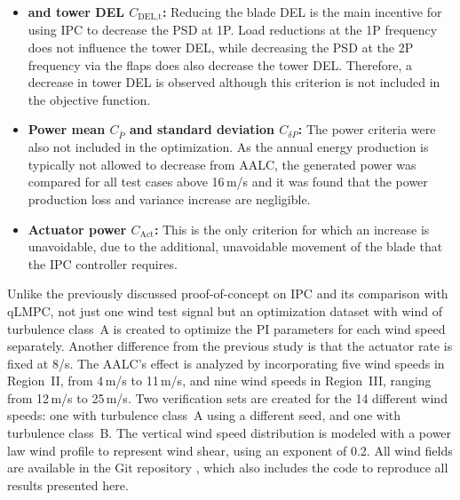\begin{itemize}
    \item \textbf{ and tower DEL $C_{\text{DEL,t}}$:} Reducing the blade DEL is the main incentive for using
    IPC to decrease the PSD at 1P. Load reductions at the 1P frequency does
    not influence the tower DEL, while decreasing the PSD at the 2P frequency via the
    flaps does also decrease the tower DEL. Therefore, a decrease in tower DEL is observed although this criterion is not included in the objective function.  
    \item \textbf{Power mean $C_{\bar{P}}$ and standard deviation $C_{\delta P}$:} The power criteria were also not included in the
    optimization. As the annual energy production is typically not allowed to decrease from AALC,
    the generated power was compared for all test cases above 16\,m/s and it was found
    that the power production loss and variance increase are negligible. %
    \item \textbf{Actuator power $C_{\text{Act}}$:} This is the only criterion for which an increase is
    unavoidable, due to the additional, unavoidable movement of the blade that
    the IPC controller requires. %
\end{itemize}
Unlike the previously discussed proof-of-concept on IPC and its comparison with qLMPC, not just one wind test signal but an optimization dataset with wind of turbulence class~A is created to optimize the PI parameters for each wind speed separately. Another difference from the previous study is that the actuator rate is fixed at 8\textdegree/s. The AALC's effect is analyzed by incorporating five wind speeds in Region~II, from 4\,m/s to 11\,m/s, and nine wind speeds in Region~III, ranging from 12\,m/s to 25\,m/s. Two verification sets are created for the 14 different wind speeds: one with turbulence class~A using a different seed, and one with turbulence class~B. The vertical wind speed distribution is modeled with a power law wind profile to represent wind shear, using an exponent of 0.2. All wind fields are available in the Git repository \cite{GitRepoCodeAALC}, which also includes the code to reproduce all results presented here. 

